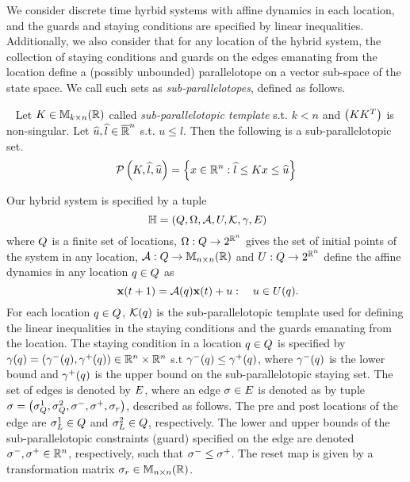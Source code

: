 We consider discrete time hyrbid systems with affine dynamics in each
location, and the guards and staying conditions are specified by
linear inequalities.  Additionally, we also consider that for any
location of the hybrid system, the collection of staying conditions
and guards on the edges emanating from the location define a (possibly
unbounded) parallelotope on a vector sub-space of the state space.  We
call such sets as \emph{sub-parallelotopes}, defined as follows.
%
\begin{definition}~\label{defn:sub-parallelotope} Let
  $K\in\mathbb{M}_{k\times n}(\mathbb{R})$ called \emph{sub-parallelotopic template}
  s.t. $k<n$ and $\left(KK^T\right)$ is non-singular.  Let
  $\widehat{u},\widehat{l}\in\mathbb{\overline{R}}^n$ s.t. $u\leq l$.  Then the following
  is a sub-parallelotopic set.
\[
\mathcal{P}\left(K,\widehat{l},\widehat{u}\right) = \left\{x\in\mathbb{R}^n: \widehat{l}\leq Kx \leq \widehat{u}\right\}
\]
\end{definition}

Our hybrid system is specified by a tuple 
\begin{equation}~\label{eqn:system}
\mathbb{H} =
\left(Q,\Omega,\mathcal{A},U,\mathcal{K},\gamma,E\right)
\end{equation}
where $Q$ is a finite set of locations,
$\Omega:Q\rightarrow 2^{\mathbb{R}^n}$ gives the set of initial points
of the system in any location,
$\mathcal{A}:Q\rightarrow\mathbb{M}_{n\times n}(\mathbb{R})$ and
$U:Q\rightarrow 2^{\mathbb{R}^n}$ define the affine dynamics in any
location $q\in Q$ as 
\begin{equation}~\label{eqn:next}
{\bf x}(t+1) = \mathcal{A}(q){\bf x}(t)+u:~~~u\in U(q).
\end{equation}
For each location $q\in Q$, $\mathcal{K}(q)$ is the
sub-parallelotopic template used for defining the linear inequalities
in the staying conditions and the guards emanating from the location.
The staying condition in a location $q\in Q$ is specified
by
$\gamma(q)=\left(\gamma^-(q),\gamma^+(q)\right)\in\mathbb{R}^n\times\mathbb{R}^n$
s.t $\gamma^-(q)\leq\gamma^+(q)$, where $\gamma^-(q)$ is the
lower bound and $\gamma^+(q)$ is the upper bound on the
sub-parallelotopic staying set.  The set of edges is denoted by
$E$, where an edge $\sigma\in E$ is denoted as by tuple
$\sigma =
\left(\sigma^1_{Q},\sigma^2_{Q},\sigma^-,\sigma^+,\sigma_r\right)$, described as
follows.  The pre and post locations of the edge are
$\sigma^1_L\in Q$ and $\sigma^2_L\in Q$,
respectively.  The lower and upper bounds of the sub-parallelotopic
constraints (guard) specified on the edge are denoted
$\sigma^-,\sigma^+\in\mathbb{R}^n$, respectively, such that
$\sigma^-\leq\sigma^+$.  The reset map is given by a transformation
matrix $\sigma_r\in\mathbb{M}_{n\times n}(\mathbb{R})$.


